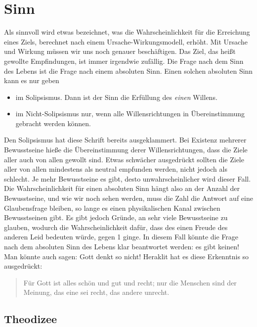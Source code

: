 \documentclass[12pt]{book}
\begin{document}
\section{Sinn}

Als sinnvoll wird etwas bezeichnet, was die Wahrscheinlichkeit für die Erreichung eines Ziels, berechnet nach einem Ursache-Wirkungsmodell, erhöht. Mit Ursache und Wirkung müssen wir uns noch genauer beschäftigen. Das Ziel, das heißt gewollte Empfindungen, ist immer irgendwie zufällig. Die Frage nach dem Sinn des Lebens ist die Frage nach einem absoluten Sinn. Einen solchen absoluten Sinn kann es nur geben
\begin{itemize}
\item im Solipsismus. Dann ist der Sinn die Erfüllung des \emph{einen} Willens.
\item im Nicht-Solipsismus nur, wenn alle Willensrichtungen in Übereinstimmung gebracht werden können.
\end{itemize}
Den Solipsismus hat diese Schrift bereits ausgeklammert. Bei Existenz mehrerer Bewusstseine hieße die Übereinstimmung derer Willensrichtungen, dass die Ziele aller auch von allen gewollt sind. Etwas schwächer ausgedrückt sollten die Ziele aller von allen mindestens als neutral empfunden werden, nicht jedoch als schlecht. Je mehr Bewusstseine es gibt, desto unwahrscheinlicher wird dieser Fall. Die Wahrscheinlichkeit für einen absoluten Sinn hängt also an der Anzahl der Bewusstseine, und wie wir noch sehen werden, muss die Zahl die Antwort auf eine Glaubensfrage bleiben, so lange es einen physikalischen Kanal zwischen Bewusstseinen gibt. Es gibt jedoch Gründe, an sehr viele Bewusstseine zu glauben, wodurch die Wahrscheinlichkeit dafür, dass des einen Freude des anderen Leid bedeuten würde, gegen 1 ginge. In diesem Fall könnte die Frage nach dem absoluten Sinn des Lebens klar beantwortet werden: es gibt keinen! Man könnte auch sagen: Gott denkt so nicht! Heraklit hat es diese Erkenntnis so ausgedrückt: 
\begin{quote}\begin{tcolorbox}
Für Gott ist alles schön und gut und recht; nur die Menschen sind der Meinung, das eine sei recht, das andere unrecht.
\end{tcolorbox}\end{quote}

\subsection{Theodizee}
\end{document}
